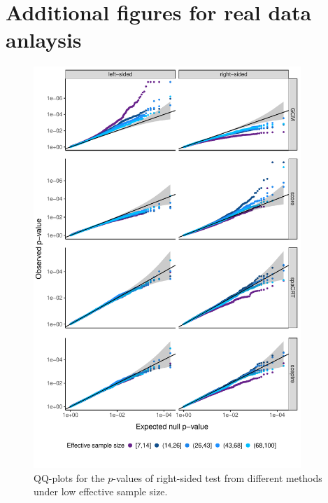 \documentclass[12pt]{article}
\theoremstyle{definition}
\begin{document}
\newpage


\section{Additional figures for real data anlaysis}\label{sec:additional_figure_realdata}

\begin{figure}[h!]
	\centering
	\includegraphics[width=0.9\textwidth]{figures-and-tables/facet_plot_different_withglmnb_100.pdf}
	\caption{QQ-plots for the $p$-values of right-sided test from different methods under low effective sample size.}
	\label{fig:qqplot_lowess}
\end{figure}
\end{document}
